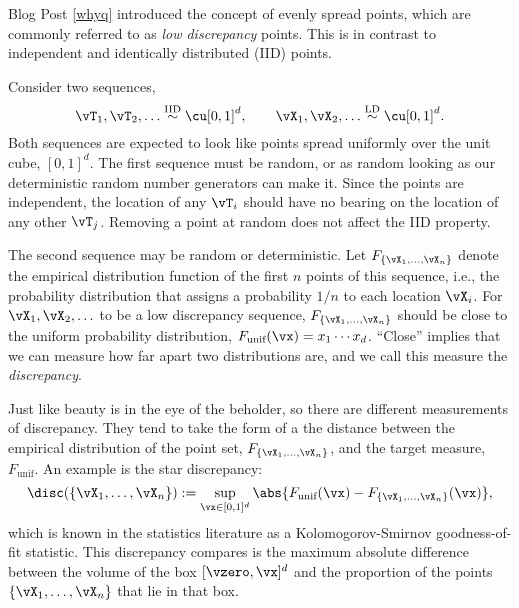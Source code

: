 Blog Post \ref{whyq} introduced the concept of evenly spread points, which are commonly referred to as \emph{low discrepancy} points.  This is in contrast to independent and identically distributed (IID) points.  

Consider two sequences,
\begin{equation}
    \vT_1, \vT_2, \ldots \overset{\text{IID}}{\sim} \cu[0,1]^d, \qquad \vX_1, \vX_2, \ldots \overset{\text{LD}}{\sim} \cu[0,1]^d.
\end{equation}
Both sequences are expected to look like points spread uniformly over the unit cube, $[0,1]^d$.  
The first sequence must be random, or as random looking as our deterministic random number generators can make it.  Since the points are independent, the location of any $\vT_i$ should have no bearing on the location of any other $\vT_j$.  Removing a point at random does not affect the IID property.

The second sequence may be random or deterministic.  Let $F_{\{\vX_1, \ldots, \vX_n\}}$ denote the empirical distribution function of the first $n$ points of this sequence, i.e., the probability distribution that assigns a probability $1/n$ to each location $\vX_i$.  For $\vX_1, \vX_2, \ldots$ to be a low discrepancy sequence, $F_{\{\vX_1, \ldots, \vX_n\}}$ should be close to the uniform probability distribution, $F_{\text{unif}}(\vx) = x_1 \cdots x_d$.  ``Close'' implies that we can measure how far apart two distributions are, and we call this measure the \emph{discrepancy}.

Just like beauty is in the eye of the beholder, so there are different measurements of discrepancy.  They tend to take the form of a the distance between the empirical distribution of the point set, $F_{\{\vX_1, \ldots, \vX_n\}}$, and the target measure, $F_{\text{unif}}$. An example is the star discrepancy:
\begin{equation*}
        \disc(\{\vX_1, \ldots, \vX_n\}) : = \sup_{\vx \in [0,1]^d}  \abs{F_{\text{unif}} (\vx) - F_{\{\vX_1, \ldots, \vX_n\}}(\vx)},
\end{equation*}
which is known in the statistics literature as a Kolomogorov-Smirnov goodness-of-fit statistic.  This discrepancy compares is the maximum absolute difference between the volume of the box $[\vzero,\vx]^d$ and the proportion of the points $\{\vX_1, \ldots, \vX_n\}$ that lie in that box.  

\cite{Hic97a}